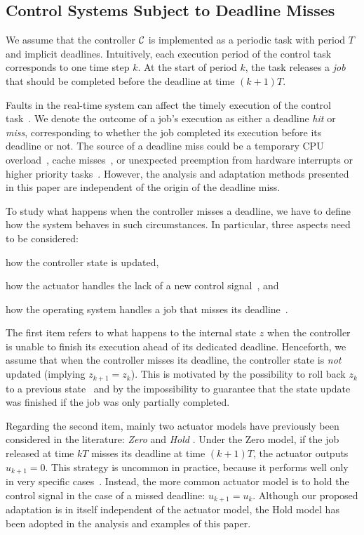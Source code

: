 \subsection{Control Systems Subject to Deadline Misses}

We assume that the controller $\mathcal{C}$ is implemented as a periodic task with period $T$ and implicit deadlines. 
Intuitively, each execution period of the control task corresponds to one time step $k$.
At the start of period $k$, the task releases a \emph{job} that should be completed before the deadline at time $(k+1) T$.

Faults in the real-time system can affect the timely execution of the control task~\cite{Steinbauer:2013}.
We denote the outcome of a job's execution as either a deadline \emph{hit} or \emph{miss}, corresponding to whether the job completed its execution before its deadline or not. 
The source of a deadline miss could be a temporary CPU overload~\cite{Baruah:1997}, cache misses~\cite{Milligan:1996, Wang:2012},  or unexpected preemption from hardware interrupts or higher priority tasks~\cite{Stankovic:1995}.
However, the analysis and adaptation methods presented in this paper are independent of the origin of the deadline miss.

To study what happens when the controller misses a deadline, we have to define how the system behaves in such circumstances.
In particular, three aspects need to be considered: 
\begin{enumerate*}[label=(\roman*)]
    \item how the controller state is updated, 
    \item how the actuator handles the lack of a new control signal~\cite{Schenato:2009}, and
    \item how the operating system handles a job that misses its deadline~\cite{Pazzaglia:2019, Cervin:2005}.
\end{enumerate*}
The first item refers to what happens to the internal state $z$ when the controller is unable to finish its execution ahead of its dedicated deadline.
Henceforth, we assume that when the controller misses its deadline, the controller state is \emph{not} updated (implying $z_{k+1} = z_k$). 
This is motivated by the possibility to roll back $z_k$ to a previous state~\cite{akesson:2020, Seong:2001, Zhang:2003} and by the impossibility to guarantee that the state update was finished if the job was only partially completed.

Regarding the second item, mainly two actuator models have previously been considered in the literature: \emph{Zero} and \emph{Hold} \cite{Schenato:2009}.
Under the Zero model, if the job released at time $kT$ misses its deadline at time  $(k+1)T$, the actuator outputs $u_{k+1} = 0$.
This strategy is uncommon in practice, because it performs well only in very specific cases~\cite{Vreman:2021ecrts}. 
Instead, the more common actuator model is to hold the control signal in the case of a missed deadline: $u_{k+1} = u_k$.
Although our proposed adaptation is in itself independent of the actuator model, the Hold model has been adopted in the analysis and examples of this paper.

